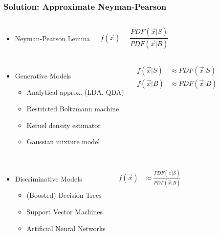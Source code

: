 \begin{frame}
    \frametitle{Solution: Approximate Neyman-Pearson}
	\vspace{-1em}	
	\begin{columns}
		\begin{itemize}
			\item Neyman-Pearson Lemma
		\end{itemize}
		\vspace{1em}
		\Large{$$f(\vec{x}) = \frac{PDF(\vec{x} | S)}{PDF(\vec{x} | B)}$$}
    \end{columns}
	\vspace{-2em}	
	\begin{columns}
		\begin{itemize}
			\item Generative Models
			\begin{itemize}
				\item Analytical approx. (LDA, QDA)
				\item Restricted Boltzmann machine
				\item Kernel density estimator
				\item Gaussian mixture model
			\end{itemize}
		\end{itemize}
		\vspace{1em}
		\Large{\begin{align*}f(\vec{x} | S) &\approx PDF(\vec{x} | S) \\ f(\vec{x} | B) &\approx PDF(\vec{x} | B)\end{align*}}
    \end{columns}
	\vspace{-1em}	
	\begin{columns}
		\begin{itemize}
			\item Discriminative Models
			\begin{itemize}
				\item (Boosted) Decision Trees
				\item Support Vector Machines
				\item Artificial Neural Networks
			\end{itemize}
		\end{itemize}
		\vspace{1em}
		\Large{\begin{align*}f(\vec{x}) &\approx  \frac{PDF(\vec{x} | S)}{PDF(\vec{x} | B)}\end{align*}}
    \end{columns}
\end{frame}

